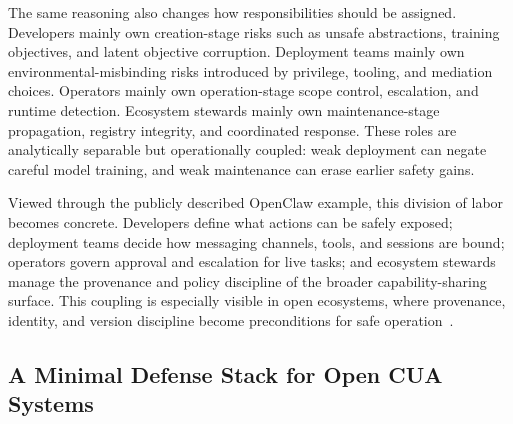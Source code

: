 The same reasoning also changes how responsibilities should be assigned. Developers mainly own creation-stage risks such as unsafe abstractions, training objectives, and latent objective corruption. Deployment teams mainly own environmental-misbinding risks introduced by privilege, tooling, and mediation choices. Operators mainly own operation-stage scope control, escalation, and runtime detection. Ecosystem stewards mainly own maintenance-stage propagation, registry integrity, and coordinated response. These roles are analytically separable but operationally coupled: weak deployment can negate careful model training, and weak maintenance can erase earlier safety gains.

Viewed through the publicly described OpenClaw example, this division of labor becomes concrete. Developers define what actions can be safely exposed; deployment teams decide how messaging channels, tools, and sessions are bound; operators govern approval and escalation for live tasks; and ecosystem stewards manage the provenance and policy discipline of the broader capability-sharing surface. This coupling is especially visible in open ecosystems, where provenance, identity, and version discipline become preconditions for safe operation~\cite{chen2026openclaw,wang2026asset,liu2026clawkeeper}.

\subsection{A Minimal Defense Stack for Open CUA Systems}
\label{subsec:recommendations}

